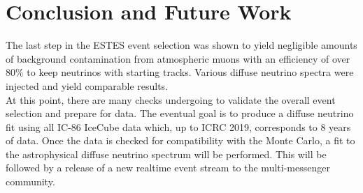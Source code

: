\documentclass{PoS}
\begin{document}
\section{Conclusion and Future Work}\label{sec:Conclusion}
The last step in the ESTES event selection was shown to yield negligible amounts of background contamination from atmospheric muons with an efficiency of over 80$\%$ to keep neutrinos with starting tracks. Various diffuse neutrino spectra were injected and yield comparable results.
\\
At this point, there are many checks undergoing to validate the overall event selection and prepare for data. The eventual goal is to produce a diffuse neutrino fit using all IC-86 IceCube data which, up to ICRC 2019, corresponds to 8 years of data. Once the data is checked for compatibility with the Monte Carlo, a fit to the astrophysical diffuse neutrino spectrum will be performed. This will be followed by a release of a new realtime event stream to the multi-messenger community.





\end{document}
